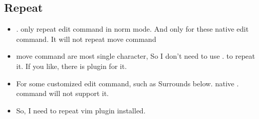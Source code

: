 \documentclass[a4paper,12pt,twoside]{book}
\begin{document}
\subsection{Repeat}
\begin{itemize}
\item . only repeat edit command in norm mode. And only for these native edit command. It will not repeat move command

\item move command are most single character, So I don't need to use . to repeat it. If you like, there is plugin for it. 

\item For some customized edit command, such as Surrounds below. native . command will not support it. 
\item So, I need to repeat vim plugin installed. 
\end{itemize}
\end{document}
